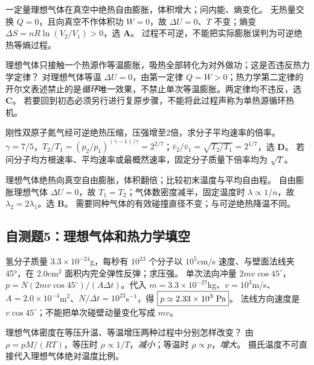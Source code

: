 \problemtext 一定量理想气体在真空中绝热自由膨胀，体积增大；问内能、熵变化。
\workings 无热量交换 $Q=0$，且向真空不作体积功 $W=0$，故 $\Delta U=0$、$T$ 不变；熵变 $\Delta S=nR\ln(V_2/V_1)>0$，选 \textbf{A}。
\crosscheck 过程不可逆，不能把实际膨胀误判为可逆绝热等熵过程。

\problemtext 理想气体只接触一个热源作等温膨胀，吸热全部转化为对外做功；这是否违反热力学定律？
\workings 对理想气体等温 $\Delta U=0$，由第一定律 $Q=W>0$；热力学第二定律的开尔文表述禁止的是\emph{循环}唯一效果，不禁止单次等温膨胀。两定律均不违反，选 \textbf{C}。
\crosscheck 若要回到初态必须另行进行复原步骤，不能将此过程声称为单热源循环热机。

\problemtext 刚性双原子氮气经可逆绝热压缩，压强增至2倍，求分子平均速率的倍率。
\workings $\gamma=7/5$，$T_2/T_1=(p_2/p_1)^{(\gamma-1)/\gamma}=2^{2/7}$；$\bar v_2/\bar v_1=\sqrt{T_2/T_1}=\boxed{2^{1/7}}$，选 \textbf{D}。
\crosscheck 若问分子均方根速率、平均速率或最概然速率，固定分子质量下倍率均为 $\sqrt T$。

\problemtext 理想气体绝热向真空自由膨胀，体积翻倍；比较初末温度与平均自由程。
\workings 自由膨胀理想气体 $\Delta U=0$，故 $T_1=T_2$；气体数密度减半，固定温度时 $\lambda\propto1/n$，故 $\lambda_2=2\lambda_1$。选 \textbf{B}。
\crosscheck 需要同种气体的有效碰撞直径不变；与可逆绝热降温不同。

\subsection{自测题5：理想气体和热力学填空}

\problemtext 氢分子质量 $3.3\times10^{-24}$g，每秒有 $10^{23}$ 个分子以 $10^5$cm/s 速度、与壁面法线夹45°，在 $2.0$cm$^2$ 面积内完全弹性反弹；求压强。
\workings 单次法向冲量 $2mv\cos45^\circ$，$p=N(2mv\cos45^\circ)/(A\Delta t)$。代入 $m=3.3\times10^{-27}$kg、$v=10^3$m/s、$A=2.0\times10^{-4}$m$^2$、$N/\Delta t=10^{23}$s$^{-1}$，得 $\boxed{p\simeq2.33\times10^3\ {\rm Pa}}$。
\crosscheck 法线方向速度是 $v\cos45^\circ$；不能把单次碰壁动量变化写成 $mv$。

\problemtext 理想气体密度在等压升温、等温增压两种过程中分别怎样改变？
\workings 由 $\rho=pM/(RT)$，等压时 $\rho\propto1/T$，\emph{减小}；等温时 $\rho\propto p$，\emph{增大}。
\crosscheck 摄氏温度不可直接代入理想气体绝对温度比例。

